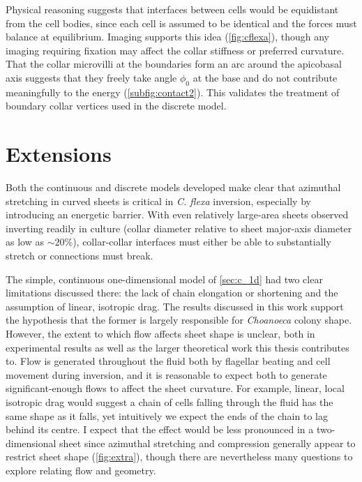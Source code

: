 Physical reasoning suggests that interfaces between cells would be equidistant from the cell bodies, since each cell is assumed to be identical and the forces must balance at equilibrium. 
Imaging supports this idea (\cref{fig:cflexa}), though any imaging requiring fixation may affect the collar stiffness or preferred curvature.
That the collar microvilli at the boundaries form an arc around the apicobasal axis suggests that they freely take angle $\phi_0$ at the base and do not contribute meaningfully to the energy (\cref{subfig:contact2}). 
This validates the treatment of boundary collar vertices used in the discrete model.

\section{Extensions}

Both the continuous and discrete models developed make clear that azimuthal stretching in curved sheets is critical in \textit{C. flexa} inversion, especially by introducing an energetic barrier.
With even relatively large-area sheets observed inverting readily in culture (collar diameter relative to sheet major-axis diameter as low as $\sim20\%$), collar-collar interfaces must either be able to substantially stretch or connections must break.

The simple, continuous one-dimensional model of \cref{sec:c_1d} had two clear limitations discussed there: the lack of chain elongation or shortening and the assumption of linear, isotropic drag.
The results discussed in this work support the hypothesis that the former is largely responsible for \textit{Choanoeca} colony shape.
However, the extent to which flow affects sheet shape is unclear, both in experimental results \citep{brunet2019} as well as the larger theoretical work this thesis contributes to.
Flow is generated throughout the fluid both by flagellar beating and cell movement during inversion, and it is reasonable to expect both to generate significant-enough flows to affect the sheet curvature.
For example, linear, local isotropic drag would suggest a chain of cells falling through the fluid has the same shape as it falls, yet intuitively we expect the ends of the chain to lag behind its centre.
I expect that the effect would be less pronounced in a two-dimensional sheet since azimuthal stretching and compression generally appear to restrict sheet shape (\cref{fig:extra}), though there are nevertheless many questions to explore relating flow and geometry.

